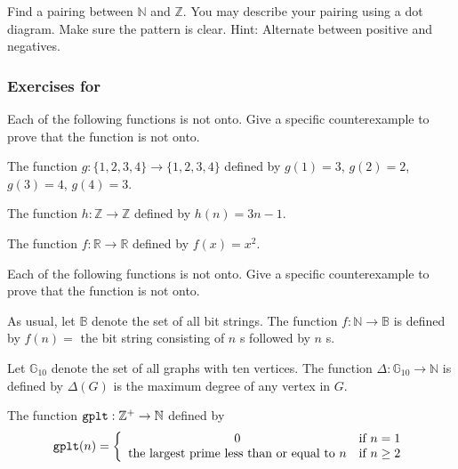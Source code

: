 \begin{exer}[\exerE] %
\label{exer_pairing_NandZ}  
    Find a pairing between $\mathbb{N}$ and $\mathbb{Z}$.  You may describe your pairing using a dot diagram.  Make sure the pattern is clear.  Hint: Alternate between positive and negatives.
\end{exer}


\subsubsection*{Exercises for  \subonetooneonto}

\begin{exer}[\exerP] %
\label{exer_not_onto_numbers}
    Each of the following functions is not onto.  Give a specific counterexample to prove that the function is not onto.
        \begin{apart}
            \item The function $g: \{1,2,3,4\} \to \{1,2,3,4\}$ defined by $g(1)=3$, $g(2)=2$, $g(3)=4$, $g(4)=3$.
            \item The function $h: \mathbb{Z} \to \mathbb{Z}$ defined by $h(n) = 3n-1$.
            \item The function $f: \mathbb{R} \to \mathbb{R}$ defined by $f(x) = x^2$.
        \end{apart}    
\end{exer}

\begin{exer}[\exerP] %
\label{exer_not_onto_discrete}
    Each of the following functions is not onto.  Give a specific counterexample to prove that the function is not onto.
        \begin{apart}
            \item As usual, let $\mathbb{B}$ denote the set of all bit strings. The function $f: \mathbb{N} \to \mathbb{B}$ is defined by $f(n)=$ the bit string consisting of $n$ s followed by $n$ s.
            \item Let $\mathbb{G}_{10}$ denote the set of all graphs with ten vertices. The function $\Delta: \mathbb{G}_{10} \to \mathbb{N}$ is defined by $\Delta(G)$ is the maximum degree of any vertex in $G$.
            \item The function $\texttt{gplt}: \mathbb{Z}^+ \to \mathbb{N}$ defined by 
                $$\texttt{gplt}(n) =
                \left\{ \begin{array}{cl}
                0 & \text{if }n=1 \\
                \text{the largest prime less than or equal to }n & \text{if }n\ge 2
                \end{array} \right.$$
        \end{apart}
\end{exer}

